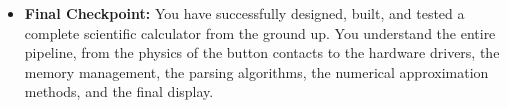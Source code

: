 \documentclass[11pt,a4paper]{article}
\begin{document}
\begin{itemize}
\begin{enumerate}
\begin{itemize}
            \item A larger \verb|h| (e.g., \verb|0.1|) will be very fast but less accurate.
            \item This is the fundamental trade-off in numerical computing: \textbf{Accuracy vs. Speed}.
        \end{itemize}
    \end{enumerate}
    \item \textbf{Final Checkpoint:} You have successfully designed, built, and tested a complete scientific calculator from the ground up. You understand the entire pipeline, from the physics of the button contacts to the hardware drivers, the memory management, the parsing algorithms, the numerical approximation methods, and the final display.
\end{itemize}
\end{document}
